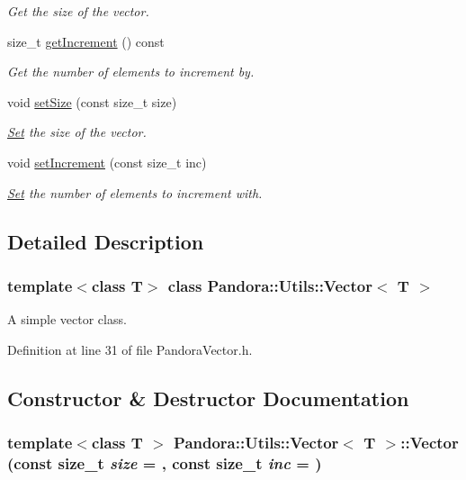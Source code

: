 \begin{DoxyCompactItemize}
\begin{DoxyCompactList}\small\item\em Get the size of the vector. \item\end{DoxyCompactList}\item 
size\_\-t \hyperlink{classPandora_1_1Utils_1_1Vector_aee155c4f9a304e540e359af6d3fec3d8}{getIncrement} () const 
\begin{DoxyCompactList}\small\item\em Get the number of elements to increment by. \item\end{DoxyCompactList}\item 
void \hyperlink{classPandora_1_1Utils_1_1Vector_adc9658f8a19f67e7e92b43c5bd4206c7}{setSize} (const size\_\-t size)
\begin{DoxyCompactList}\small\item\em \hyperlink{classPandora_1_1Utils_1_1Set}{Set} the size of the vector. \item\end{DoxyCompactList}\item 
void \hyperlink{classPandora_1_1Utils_1_1Vector_a7712e06b6660e77796a6d4093d949e8e}{setIncrement} (const size\_\-t inc)
\begin{DoxyCompactList}\small\item\em \hyperlink{classPandora_1_1Utils_1_1Set}{Set} the number of elements to increment with. \item\end{DoxyCompactList}\end{DoxyCompactItemize}


\subsection{Detailed Description}
\subsubsection*{template$<$class T$>$ class Pandora::Utils::Vector$<$ T $>$}

A simple vector class. 

Definition at line 31 of file PandoraVector.h.

\subsection{Constructor \& Destructor Documentation}
\hypertarget{classPandora_1_1Utils_1_1Vector_a08c4f102c57e56cabbca1c15e8c17122}{
\subsubsection[{Vector}]{\setlength{\rightskip}{0pt plus 5cm}template$<$class T $>$ {\bf Pandora::Utils::Vector}$<$ T $>$::{\bf Vector} (const size\_\-t {\em size} = {}, \/  const size\_\-t {\em inc} = {})}}
\label{classPandora_1_1Utils_1_1Vector_a08c4f102c57e56cabbca1c15e8c17122}


